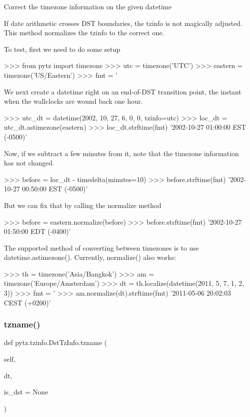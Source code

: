 \begin{DoxyVerb}Correct the timezone information on the given datetime

If date arithmetic crosses DST boundaries, the tzinfo
is not magically adjusted. This method normalizes the
tzinfo to the correct one.

To test, first we need to do some setup

>>> from pytz import timezone
>>> utc = timezone('UTC')
>>> eastern = timezone('US/Eastern')
>>> fmt = '%

We next create a datetime right on an end-of-DST transition point,
the instant when the wallclocks are wound back one hour.

>>> utc_dt = datetime(2002, 10, 27, 6, 0, 0, tzinfo=utc)
>>> loc_dt = utc_dt.astimezone(eastern)
>>> loc_dt.strftime(fmt)
'2002-10-27 01:00:00 EST (-0500)'

Now, if we subtract a few minutes from it, note that the timezone
information has not changed.

>>> before = loc_dt - timedelta(minutes=10)
>>> before.strftime(fmt)
'2002-10-27 00:50:00 EST (-0500)'

But we can fix that by calling the normalize method

>>> before = eastern.normalize(before)
>>> before.strftime(fmt)
'2002-10-27 01:50:00 EDT (-0400)'

The supported method of converting between timezones is to use
datetime.astimezone(). Currently, normalize() also works:

>>> th = timezone('Asia/Bangkok')
>>> am = timezone('Europe/Amsterdam')
>>> dt = th.localize(datetime(2011, 5, 7, 1, 2, 3))
>>> fmt = '%
>>> am.normalize(dt).strftime(fmt)
'2011-05-06 20:02:03 CEST (+0200)'
\end{DoxyVerb}
 \mbox{\label{classpytz_1_1tzinfo_1_1DstTzInfo_a24a2e17fde25003aab9059156c9bd06f}} 
\subsubsection{\texorpdfstring{tzname()}{tzname()}}
{\footnotesize\ttfamily def pytz.\+tzinfo.\+Dst\+Tz\+Info.\+tzname (\begin{DoxyParamCaption}\item[{}]{self,  }\item[{}]{dt,  }\item[{}]{is\+\_\+dst = {\ttfamily None} }\end{DoxyParamCaption})}

